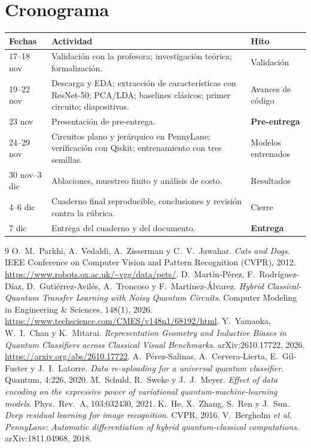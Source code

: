 \documentclass[11pt,letterpaper]{article}
\begin{document}
\section{Cronograma}
\begin{table}[H]
\centering\small
\begin{tabular}{@{}p{3.0cm}p{9.2cm}p{2.3cm}@{}}
\toprule
Fechas & Actividad & Hito \\ \midrule
17--18 nov & Validación con la profesora; investigación teórica; formalización. & Validación \\
19--22 nov & Descarga y EDA; extracción de características con ResNet-50; PCA/LDA; baselines
clásicos; primer circuito; diapositivas. & Avances de código \\
23 nov & Presentación de pre-entrega. & \textbf{Pre-entrega} \\
24--29 nov & Circuitos plano y jerárquico en PennyLane; verificación con Qiskit; entrenamiento con
tres semillas. & Modelos entrenados \\
30 nov--3 dic & Ablaciones, muestreo finito y análisis de costo. & Resultados \\
4--6 dic & Cuaderno final reproducible, conclusiones y revisión contra la rúbrica. & Cierre \\
7 dic & Entrega del cuaderno y del documento. & \textbf{Entrega} \\
\bottomrule
\end{tabular}
\end{table}

\begin{thebibliography}{9}
 O.\ M.\ Parkhi, A.\ Vedaldi, A.\ Zisserman y C.\ V.\ Jawahar. \emph{Cats and
Dogs}. IEEE Conference on Computer Vision and Pattern Recognition (CVPR), 2012.
\url{https://www.robots.ox.ac.uk/~vgg/data/pets/}.
 D.\ Martín-Pérez, F.\ Rodríguez-Díaz, D.\ Gutiérrez-Avilés, A.\ Troncoso y
F.\ Martínez-Álvarez. \emph{Hybrid Classical-Quantum Transfer Learning with Noisy Quantum Circuits}.
Computer Modeling in Engineering \& Sciences, 148(1), 2026.
\url{https://www.techscience.com/CMES/v148n1/68192/html}.
 Y.\ Yamaoka, W.\ I.\ Chan y K.\ Mitarai. \emph{Representation Geometry and
Inductive Biases in Quantum Classifiers across Classical Visual Benchmarks}. arXiv:2610.17722, 2026.
\url{https://arxiv.org/abs/2610.17722}.
 A.\ Pérez-Salinas, A.\ Cervera-Lierta, E.\ Gil-Fuster y J.\ I.\ Latorre.
\emph{Data re-uploading for a universal quantum classifier}. Quantum, 4:226, 2020.
 M.\ Schuld, R.\ Sweke y J.\ J.\ Meyer. \emph{Effect of data encoding on the
expressive power of variational quantum-machine-learning models}. Phys.\ Rev.\ A, 103:032430, 2021.
 K.\ He, X.\ Zhang, S.\ Ren y J.\ Sun. \emph{Deep residual learning for image
recognition}. CVPR, 2016.
 V.\ Bergholm \emph{et al.} \emph{PennyLane: Automatic differentiation of hybrid
quantum-classical computations}. arXiv:1811.04968, 2018.
\end{thebibliography}
\end{document}
